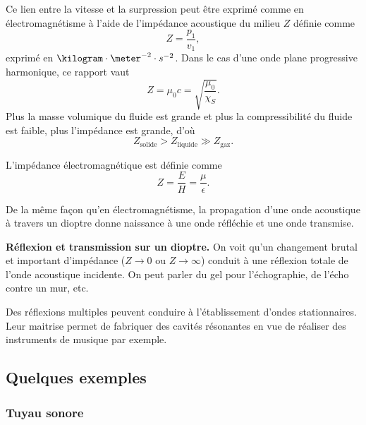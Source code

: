 Ce lien entre la vitesse et la surpression peut être exprimé comme en électromagnétisme à l'aide de l'impédance acoustique du milieu $Z$ définie comme
\begin{equation}
Z = \frac{p_1}{v_1},
\end{equation}
exprimé en $\kilogram \cdot \meter^{-2} \cdot s^{-2}$.
Dans le cas d'une onde plane progressive harmonique, ce rapport vaut
\begin{equation}
Z = \mu_0 c = \sqrt{\frac{\mu_0}{\chi_S}}.
\end{equation}
Plus la masse volumique du fluide est grande et plus la compressibilité du fluide est faible, plus l'impédance est grande, d'où
\begin{equation*}
Z_\mathrm{solide} > Z_\mathrm{liquide} \gg Z_\mathrm{gaz}.
\end{equation*}
\begin{remarque}
L'impédance électromagnétique est définie comme
\begin{equation*}
Z = \frac{E}{H} = \frac{\mu}{\epsilon}.
\end{equation*}
\end{remarque}

De la même façon qu'en électromagnétisme, la propagation d'une onde acoustique à travers un dioptre donne naissance à une onde réfléchie et une onde transmise.
\begin{slide}
\textbf{Réflexion et transmission sur un dioptre.}
On voit qu'un changement brutal et important d'impédance ($Z\rightarrow 0$ ou $Z\rightarrow \infty$) conduit à une réflexion totale de l'onde acoustique incidente.
On peut parler du gel pour l'échographie, de l'écho contre un mur, etc.
\end{slide}

\begin{transition}
Des réflexions multiples peuvent conduire à l'établissement d'ondes stationnaires.
Leur maitrise permet de fabriquer des cavités résonantes en vue de réaliser des instruments de musique par exemple.
\end{transition}

\subsection{Quelques exemples}

\subsubsection{Tuyau sonore}

